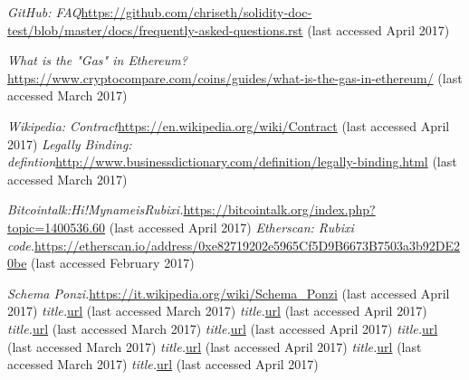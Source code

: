 \begin{thebibliography}{99}
\emph{GitHub: FAQ}\url{https://github.com/chriseth/solidity-doc-test/blob/master/docs/frequently-asked-questions.rst} (last accessed April 2017)




\emph{What is the "Gas" in Ethereum?}\url{https://www.cryptocompare.com/coins/guides/what-is-the-gas-in-ethereum/} (last accessed March 2017)

\emph{Wikipedia: Contract}\url{https://en.wikipedia.org/wiki/Contract} (last accessed April 2017)
\emph{Legally Binding: defintion}\url{http://www.businessdictionary.com/definition/legally-binding.html} (last accessed March 2017)


\emph{Bitcointalk:Hi!MynameisRubixi.}\url{https://bitcointalk.org/index.php?topic=1400536.60} (last accessed April 2017)
\emph{Etherscan: Rubixi code.}\url{https://etherscan.io/address/0xe82719202e5965Cf5D9B6673B7503a3b92DE20be} (last accessed February 2017)
    
    
\emph{Schema Ponzi.}\url{https://it.wikipedia.org/wiki/Schema_Ponzi} (last accessed April 2017)
\emph{title.}\url{url} (last accessed March 2017)
\emph{title.}\url{url} (last accessed April 2017)
\emph{title.}\url{url} (last accessed March 2017)
\emph{title.}\url{url} (last accessed April 2017)
\emph{title.}\url{url} (last accessed March 2017)
\emph{title.}\url{url} (last accessed April 2017)
\emph{title.}\url{url} (last accessed March 2017)
\emph{title.}\url{url} (last accessed April 2017)









\end{thebibliography}

